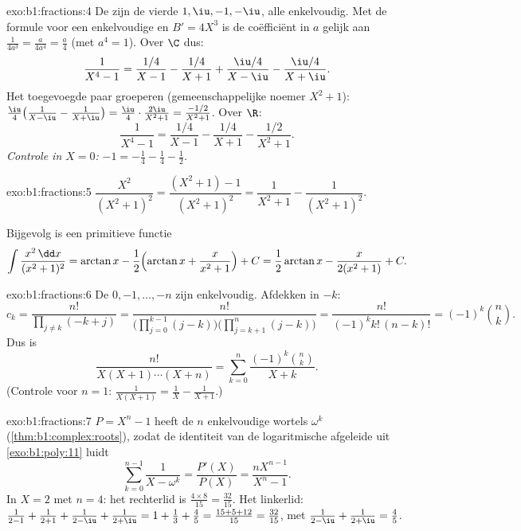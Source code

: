 \begin{solution}{exo:b1:fractions:4}
De  zijn de vierde  $1, \iu, -1, -\iu$, alle
enkelvoudig. Met de formule voor een enkelvoudige  en $B' = 4X^3$ is
de coëfficiënt in $a$ gelijk aan $\frac{1}{4a^3} = \frac{a}{4a^4} =
\frac a4$ (met $a^4 = 1$). Over $\C$ dus:
\[
\frac{1}{X^4 - 1}
= \frac{1/4}{X - 1} - \frac{1/4}{X + 1}
+ \frac{\iu/4}{X - \iu} - \frac{\iu/4}{X + \iu} .
\]
Het toegevoegde paar groeperen (gemeenschappelijke noemer $X^2 + 1$):
$\frac{\iu}{4}\bigl(\frac{1}{X-\iu} - \frac{1}{X+\iu}\bigr) =
\frac{\iu}{4}\cdot\frac{2\iu}{X^2+1} = \frac{-1/2}{X^2+1}$. Over $\R$:
\[
\frac{1}{X^4 - 1}
= \frac{1/4}{X-1} - \frac{1/4}{X+1} - \frac{1/2}{X^2 + 1} .
\]
\emph{Controle in $X = 0$:} $-1 = -\frac14 - \frac14 - \frac12$.
\end{solution}

\begin{solution}{exo:b1:fractions:5}
$\dfrac{X^2}{(X^2+1)^2} = \dfrac{(X^2 + 1) - 1}{(X^2+1)^2} =
\dfrac{1}{X^2+1} - \dfrac{1}{(X^2+1)^2}$.

Bijgevolg is een primitieve functie
\[
\int \frac{x^2\,\dd x}{(x^2+1)^2}
= \arctan x - \frac12\Bigl(\arctan x + \frac{x}{x^2+1}\Bigr) + C
= \frac12\arctan x - \frac{x}{2(x^2+1)} + C .
\]
\end{solution}

\begin{solution}{exo:b1:fractions:6}
De  $0, -1, \dots, -n$ zijn enkelvoudig. Afdekken in $-k$:
\[
c_k = \frac{n!}{\prod_{j \neq k} (-k + j)}
= \frac{n!}{\bigl(\prod_{j=0}^{k-1}(j - k)\bigr)
\bigl(\prod_{j=k+1}^{n}(j-k)\bigr)}
= \frac{n!}{(-1)^k k!\,(n-k)!} = (-1)^k \binom nk .
\]
Dus is
\[
\frac{n!}{X(X+1)\cdots(X+n)}
= \sum_{k=0}^{n} \frac{(-1)^k \binom nk}{X + k} .
\]
(Controle voor $n = 1$: $\frac{1}{X(X+1)} = \frac1X - \frac{1}{X+1}$.)
\end{solution}

\begin{solution}{exo:b1:fractions:7}
$P = X^n - 1$ heeft de $n$ enkelvoudige wortels $\omega^k$
(\cref{thm:b1:complex:roots}), zodat de identiteit van de logaritmische
afgeleide uit \cref{exo:b1:poly:11} luidt
\[
\sum_{k=0}^{n-1} \frac{1}{X - \omega^k}
= \frac{P'(X)}{P(X)} = \frac{n X^{n-1}}{X^n - 1} .
\]
In $X = 2$ met $n = 4$: het rechterlid is $\frac{4 \times 8}{15} =
\frac{32}{15}$. Het linkerlid: $\frac{1}{2-1} + \frac{1}{2+1} +
\frac{1}{2 - \iu} + \frac{1}{2 + \iu} = 1 + \frac13 + \frac{4}{5} =
\frac{15 + 5 + 12}{15} = \frac{32}{15}$, met $\frac{1}{2-\iu} +
\frac{1}{2+\iu} = \frac{4}{5}$.
\end{solution}

